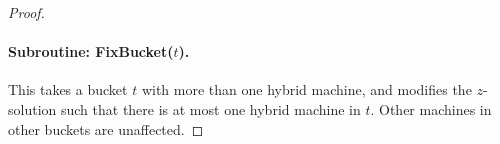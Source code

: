 \begin{proof}
%	
\paragraph{Subroutine: {\sf FixBucket}($t$).} This takes a bucket $t$ with more than one hybrid machine, and modifies the $z$-solution such that
there is at most one hybrid machine in $t$. Other machines in other buckets are unaffected.

 
% 
	

\end{proof}

